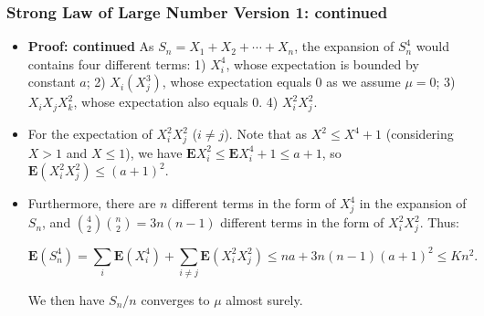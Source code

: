 \documentclass[handout]{beamer}
\newcommand{\BE}{\mathbf{E}}
\begin{document}
\frame
{
  \frametitle{Strong Law of Large Number Version 1: continued}

\begin{itemize}
      
      \item<1-> \textbf{Proof: continued} As $S_n=X_1+X_2+\cdots +X_n$, the expansion of $S_n^4$ would contains four different terms: 1)  $X_i^4$, whose expectation is bounded by constant $a$; 2) $X_i (X_j^3)$, whose expectation equals 0 as we assume $\mu=0$; 3) $X_i X_j X_k^2$, whose expectation also equals 0. 4) $X_i^2 X_j^2$. 
      
      \item<2->[-] For the expectation of $X_i^2 X_j^2$ ($i\neq j$). Note that as $X^2\leq X^4+1$ (considering $X>1$ and $X\leq 1$), we have $\BE X_i^2 \leq \BE X_i^4+1\leq a+1$, so $\BE(X_i^2 X_j^2)\leq (a+1)^2$. 
            
      \item<3->[-] Furthermore, there are $n$ different terms in the form of $X_j^4$ in the expansion of $S_n$, and ${4 \choose 2}{n \choose 2}=3n(n-1)$ different terms in the form of $X_i^2X_j^2$. Thus:
      
      $$\BE(S_n^4)= \sum_i \BE (X_i^4)+\sum_{i\neq j} \BE(X_i^2 X_j^2)\leq n a+ 3n(n-1) (a+1)^2 \leq Kn^2.$$      
             
             We then have $S_n/n$ converges to $\mu$ almost surely.         
                                      
\end{itemize}
}
\end{document}
